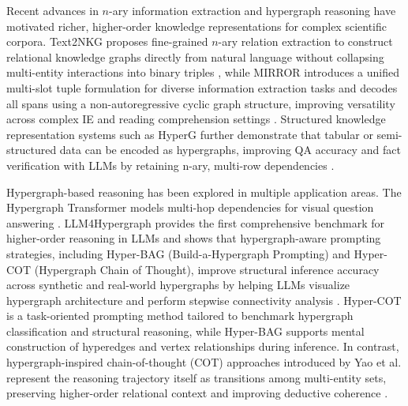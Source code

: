 \documentclass{article}
\begin{document}
Recent advances in $n$-ary information extraction and hypergraph reasoning have motivated richer, higher-order knowledge representations for complex scientific corpora. Text2NKG proposes fine-grained $n$-ary relation extraction to construct relational knowledge graphs directly from natural language without collapsing multi-entity interactions into binary triples \cite{luo_text2nkg_2024}, while MIRROR introduces a unified multi-slot tuple formulation for diverse information extraction tasks and decodes all spans using a non-autoregressive cyclic graph structure, improving versatility across complex IE and reading comprehension settings \cite{zhu_mirror_2023}. Structured knowledge representation systems such as HyperG further demonstrate that tabular or semi-structured data can be encoded as hypergraphs, improving QA accuracy and fact verification with LLMs by retaining n-ary, multi-row dependencies \cite{huang_hyperg_2025}. 

Hypergraph-based reasoning has been explored in multiple application areas. The Hypergraph Transformer models multi-hop dependencies for visual question answering \cite{heo_hypergraph_2022}. LLM4Hypergraph provides the first comprehensive benchmark for higher-order reasoning in LLMs and shows that hypergraph-aware prompting strategies, including Hyper-BAG (Build-a-Hypergraph Prompting) and Hyper-COT (Hypergraph Chain of Thought), improve structural inference accuracy across synthetic and real-world hypergraphs by helping LLMs visualize hypergraph architecture and perform stepwise connectivity analysis \cite{feng_beyond_2024}. Hyper-COT is a task-oriented prompting method tailored to benchmark hypergraph classification and structural reasoning, while Hyper-BAG supports mental construction of hyperedges and vertex relationships during inference. In contrast, hypergraph-inspired chain-of-thought (COT) approaches introduced by Yao et al. represent the reasoning trajectory itself as transitions among multi-entity sets, preserving higher-order relational context and improving deductive coherence \cite{yao_thinking_2023}. 
\end{document}
